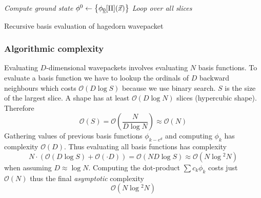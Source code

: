 \documentclass{article}
\begin{document}
\begin{algorithm}[H]
  \emph{Compute ground state}\;
  \(\phi^0 \gets \left\{ \phi_{\underline{0}}[\Pi](\vec{x}) \right\} \)\;
  \emph{Loop over all slices}\;
  \caption{Recursive basis evaluation of hagedorn wavepacket}
\end{algorithm}

\subsubsection{Algorithmic complexity} \label{sec:hawp_eval_runtime_complexity}
Evaluating \(D\)-dimensional wavepackets involves evaluating \(N\) basis functions.
To evaluate a basis function we have to lookup the ordinals of \(D\)
backward neighbours which costs \(\mathcal{O}(D \log{}S)\) because we use binary search.
\(S\) is the size of the largest slice. A shape has at least \(\mathcal{O}(D\log{}N)\)
slices (hypercubic shape). Therefore
\[
  \mathcal{O}(S)=\mathcal{O}(\frac{N}{D\log{}N}) \approx \mathcal{O}(N)
\]
Gathering values of previous basis functions \(\phi_{k-e^d}\) and computing \(\phi_k\)
has complexity \(\mathcal{O}(D)\).
Thus evaluating all basis functions has complexity
\[
  N \cdot \left(\mathcal{O}(D\log{}S) + \mathcal{O}(\cdot D)\right) =
  \mathcal{O}(ND\log{}S) \approx
  \mathcal{O}(N\log{}^2 N)
\]
when assuming \(D \approx \log{}N\).
Computing the dot-product \(\sum c_k\phi_k\) costs just \(\mathcal{O}(N)\)
thus the final \emph{asymptotic} complexity
\begin{equation}
  \label{eq:hawp_eval_complexity}
  \mathcal{O}(N\log{}^2N)
\end{equation}
\end{document}
